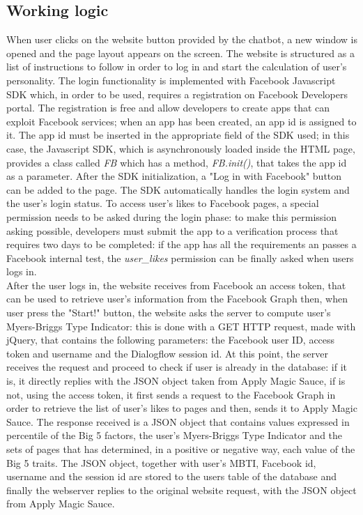 \documentclass[b5paper,10pt,twoside,cucitura]{toptesi}
\begin{document}
\subsection{Working logic}
When user clicks on the website button provided by the chatbot, a new window is opened and the page layout appears on the screen. The website is structured as a list of instructions to follow in order to log in and start the calculation of user's personality. The login functionality is implemented with Facebook Javascript SDK which, in order to be used, requires a registration on Facebook Developers portal. The registration is free and allow developers to create apps that can exploit Facebook services; when an app has been created, an app id is assigned to it. The app id must be inserted in the appropriate field of the SDK used; in this case, the Javascript SDK, which is asynchronously loaded inside the HTML page, provides a class called \textit{FB} which has a method, \textit{FB.init()}, that takes the app id as a parameter. After the SDK initialization, a "Log in with Facebook" button can be added to the page. The SDK automatically handles the login system and the user's login status. To access user's likes to Facebook pages, a special permission needs to be asked during the login phase: to make this permission asking possible, developers must submit the app to a verification process that requires two days to be completed: if the app has all the requirements an passes a Facebook internal test, the \textit{user\_likes} permission can be finally asked when users logs in. 
\\
After the user logs in, the website receives from Facebook an access token, that can be used to retrieve user's information from the Facebook Graph then, when user press the "Start!" button, the website asks the server to compute user's Myers-Briggs Type Indicator: this is done with a GET HTTP request, made with jQuery, that contains the following parameters: the Facebook user ID, access token and username and the Dialogflow session id. At this point, the server receives the request and proceed to check if user is already in the database: if it is, it directly replies with the JSON object taken from Apply Magic Sauce, if is not, using the access token, it first sends a request to the Facebook Graph in order to retrieve the list of user's likes to pages and then, sends it to Apply Magic Sauce. The response received is a JSON object that contains values expressed in percentile of the Big 5 factors, the user's Myers-Briggs Type Indicator and the sets of pages that has determined, in a positive or negative way, each value of the Big 5 traits. The JSON object, together with user's MBTI, Facebook id, username and the session id are stored to the users table of the database and finally the webserver replies to the original website request, with the JSON object from Apply Magic Sauce.
\end{document}
